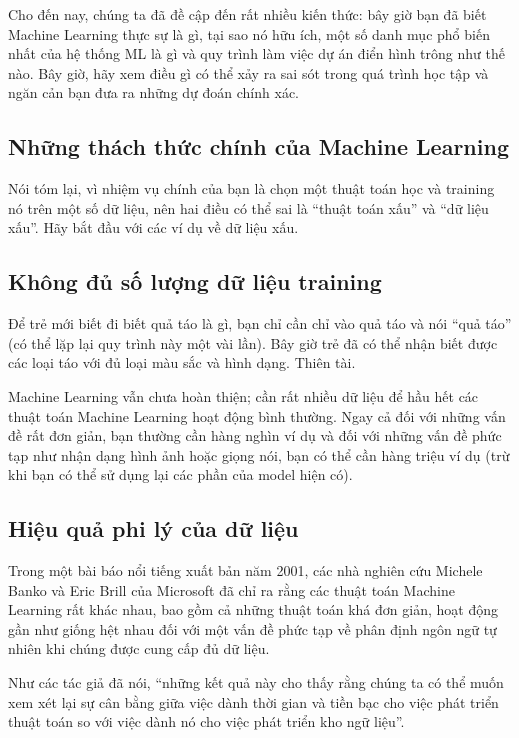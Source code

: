 Cho đến nay, chúng ta đã đề cập đến rất nhiều kiến ​​thức: bây giờ bạn đã biết Machine Learning thực sự là gì, tại sao nó hữu ích, một số danh mục phổ biến nhất của hệ thống ML là gì và quy trình làm việc dự án điển hình trông như thế nào. Bây giờ, hãy xem điều gì có thể xảy ra sai sót trong quá trình học tập và ngăn cản bạn đưa ra những dự đoán chính xác.

\subsection{Những thách thức chính của Machine Learning}

Nói tóm lại, vì nhiệm vụ chính của bạn là chọn một thuật toán học và training nó trên một số dữ liệu, nên hai điều có thể sai là “thuật toán xấu” và “dữ liệu xấu”. Hãy bắt đầu với các ví dụ về dữ liệu xấu.

\subsection{Không đủ số lượng dữ liệu training}

Để trẻ mới biết đi biết quả táo là gì, bạn chỉ cần chỉ vào quả táo và nói “quả táo” (có thể lặp lại quy trình này một vài lần). Bây giờ trẻ đã có thể nhận biết được các loại táo với đủ loại màu sắc và hình dạng. Thiên tài.

Machine Learning vẫn chưa hoàn thiện; cần rất nhiều dữ liệu để hầu hết các thuật toán Machine Learning hoạt động bình thường. Ngay cả đối với những vấn đề rất đơn giản, bạn thường cần hàng nghìn ví dụ và đối với những vấn đề phức tạp như nhận dạng hình ảnh hoặc giọng nói, bạn có thể cần hàng triệu ví dụ (trừ khi bạn có thể sử dụng lại các phần của model hiện có).

\subsection{Hiệu quả phi lý của dữ liệu}

Trong một bài báo nổi tiếng xuất bản năm 2001, các nhà nghiên cứu Michele Banko và Eric Brill của Microsoft đã chỉ ra rằng các thuật toán Machine Learning rất khác nhau, bao gồm cả những thuật toán khá đơn giản, hoạt động gần như giống hệt nhau đối với một vấn đề phức tạp về phân định ngôn ngữ tự nhiên khi chúng được cung cấp đủ dữ liệu.

Như các tác giả đã nói, “những kết quả này cho thấy rằng chúng ta có thể muốn xem xét lại sự cân bằng giữa việc dành thời gian và tiền bạc cho việc phát triển thuật toán so với việc dành nó cho việc phát triển kho ngữ liệu”.

